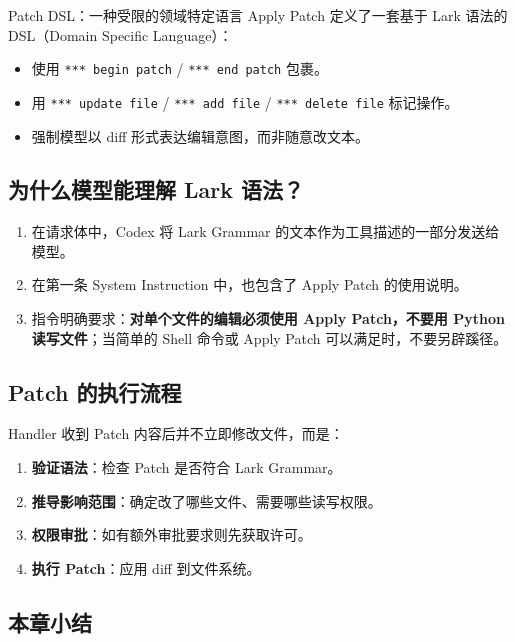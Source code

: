 \documentclass[a4paper]{article}
\begin{document}
\begin{importantbox}{Patch DSL：一种受限的领域特定语言}
Apply Patch 定义了一套基于 Lark 语法的 DSL（Domain Specific Language）：
\begin{itemize}
    \item 使用 \texttt{*** begin patch} / \texttt{*** end patch} 包裹。
    \item 用 \texttt{*** update file} / \texttt{*** add file} / \texttt{*** delete file} 标记操作。
    \item 强制模型以 diff 形式表达编辑意图，而非随意改文本。
\end{itemize}
\end{importantbox}

\subsection{为什么模型能理解 Lark 语法？}

\begin{enumerate}
    \item 在请求体中，Codex 将 Lark Grammar 的文本作为工具描述的一部分发送给模型。
    \item 在第一条 System Instruction 中，也包含了 Apply Patch 的使用说明。
    \item 指令明确要求：\textbf{对单个文件的编辑必须使用 Apply Patch，不要用 Python 读写文件}；当简单的 Shell 命令或 Apply Patch 可以满足时，不要另辟蹊径。
\end{enumerate}

\subsection{Patch 的执行流程}

Handler 收到 Patch 内容后并不立即修改文件，而是：
\begin{enumerate}
    \item \textbf{验证语法}：检查 Patch 是否符合 Lark Grammar。
    \item \textbf{推导影响范围}：确定改了哪些文件、需要哪些读写权限。
    \item \textbf{权限审批}：如有额外审批要求则先获取许可。
    \item \textbf{执行 Patch}：应用 diff 到文件系统。
\end{enumerate}

\subsection{本章小结}
\end{document}
